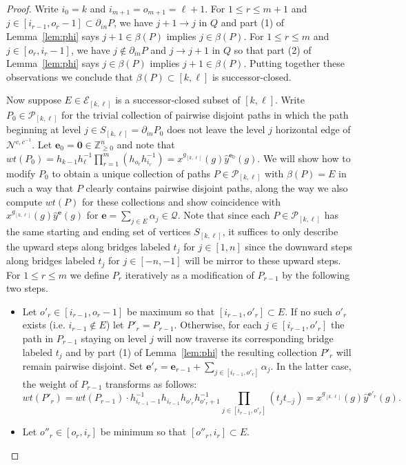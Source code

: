 \documentclass[12pt]{amsart}
\newcommand{\ZZ}{\mathbb{Z}}
\newcommand{\bfe}{\mathbf{e}}
\newcommand{\cE}{\mathcal{E}}
\newcommand{\cN}{\mathcal{N}} %
\newcommand{\cP}{\mathcal{P}}
\newcommand{\cQ}{\mathcal{Q}}
\theoremstyle{remark}
\numberwithin{equation}{section}
\begin{document}
\begin{proof}
Write $i_0=k$ and $i_{m+1}=o_{m+1}=\ell+1$.  For $1\le r\le m+1$ and $j\in[i_{r-1},o_r-1]\subset\partial_{in}P$, we have $j+1\to j$ in $Q$ and part (1) of Lemma~\ref{lem:phi} says $j+1\in\beta(P)$ implies $j\in\beta(P)$.  
For $1\le r\le m$ and $j\in[o_r,i_r-1]$, we have $j\notin\partial_{in}P$ and $j\to j+1$ in $Q$ so that part (2) of Lemma~\ref{lem:phi} says $j\in\beta(P)$ implies $j+1\in\beta(P)$.  
Putting together these observations we conclude that $\beta(P)\subset[k,\ell]$ is successor-closed.

Now suppose $E\in\cE_{[k,\ell]}$ is a successor-closed subset of $[k,\ell]$.  
Write $P_0\in\cP_{[k,\ell]}$ for the trivial collection of pairwise disjoint paths in which the path beginning at level $j\in S_{[k,\ell]}=\partial_{in}P_0$ does not leave the level $j$ horizontal edge of $\cN^{c,c^{-1}}$.  
Let $\bfe_0=\boldsymbol{0}\in\ZZ_{\ge0}^n$ and note that $wt(P_0)=h_{k-1}h_\ell^{-1}\prod_{r=1}^m (h_{o_r}h_{i_r}^{-1})=x^{g_{[k,\ell]}}(g)\hat y^{\bfe_0}(g)$.  
We will show how to modify $P_0$ to obtain a unique collection of paths $P\in\cP_{[k,\ell]}$ with $\beta(P)=E$ in such a way that $P$ clearly contains pairwise disjoint paths, along the way we also compute $wt(P)$ for these collections and show coincidence with $x^{g_{[k,\ell]}}(g)\hat y^\bfe(g)$ for $\bfe=\sum\limits_{j\in E}\alpha_j\in\cQ$.  Note that since each $P\in\cP_{[k,\ell]}$ has the same starting and ending set of vertices $S_{[k,\ell]}$, it suffices to only describe the upward steps along bridges labeled $t_j$ for $j\in[1,n]$ since the downward steps along bridges labeled $t_j$ for $j\in[-n,-1]$ will be mirror to these upward steps.  
For $1\le r\le m$ we define $P_r$ iteratively as a modification of $P_{r-1}$ by the following two steps.
\begin{itemize}
  \item Let $o'_r\in[i_{r-1},o_r-1]$ be maximum so that $[i_{r-1},o'_r]\subset E$.  
  If no such $o'_r$ exists (i.e. $i_{r-1}\notin E$) let $P'_r=P_{r-1}$.  
  Otherwise, for each $j\in[i_{r-1},o'_r]$ the path in $P_{r-1}$ staying on level $j$ will now traverse its corresponding bridge labeled $t_j$ and by part (1) of Lemma~\ref{lem:phi} the resulting collection $P'_r$ will remain pairwise disjoint.  
  Set $\bfe'_r=\bfe_{r-1}+\sum\limits_{j\in[i_{r-1},o'_r]}\alpha_j$.
  In the latter case, the weight of $P_{r-1}$ transforms as follows: 
  \[wt(P'_r)=wt(P_{r-1})\cdot h_{i_{r-1}-1}^{-1}h_{i_{r-1}}h_{o'_r}h_{o'_r+1}^{-1}\prod_{j\in[i_{r-1},o'_r]}(t_jt_{-j})=x^{g_{[k,\ell]}}(g)\hat y^{\bfe'_r}(g).\]
  \item Let $o''_r\in[o_r,i_r]$ be minimum so that $[o''_r,i_r]\subset E$.  

\end{itemize}
\end{proof}
\end{document}
